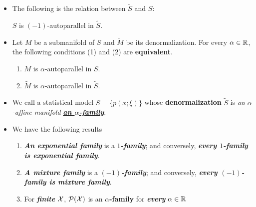 \documentclass[11pt]{article}
\begin{document}
\begin{itemize}
\item The following is the relation between $\widetilde{S}$ and $S$:
\begin{proposition}
$S$ is $(-1)$-autoparallel in $\widetilde{S}$.
\end{proposition}

\item \begin{proposition}
Let $M$ be a submanifold of $S$ and $\widetilde{M}$ be its denormalization. For every $\alpha \in {\mathbb R}$, the following conditions (1) and (2) are \textbf{equivalent}.
\begin{enumerate}
\item $M$ is $\alpha$-autoparallel in $S$.
\item $\widetilde{M}$ is $\alpha$-autoparallel in $\widetilde{S}$.
\end{enumerate}
\end{proposition}

\item \begin{definition}
We call a statistical model $S = \{p(x; \xi)\}$ whose \textbf{denormalization} $\widetilde{S}$ is \emph{an $\alpha$-affine manifold} \underline{\textbf{\emph{an $\alpha$-family}}}.
\end{definition}

\item \begin{remark} We have the following results
\begin{enumerate}
\item \emph{\textbf{An exponential family}} is a \emph{\textbf{$1$-family}}; and conversely, \emph{\textbf{every $1$-family is  exponential family}}.

\item \emph{\textbf{A mixture family}} is a \emph{\textbf{$(-1)$-family}}; and conversely, \emph{\textbf{every $(-1)$-family is  mixture family}}.

\item For \emph{\textbf{finite}} ${\mathcal X}$, ${\mathcal P}({\mathcal X})$ is an \textbf{$\alpha$-family} for \emph{\textbf{every}} $\alpha \in {\mathbb R}$
\end{enumerate}

\end{remark}
\end{itemize}

\newpage
\end{document}
